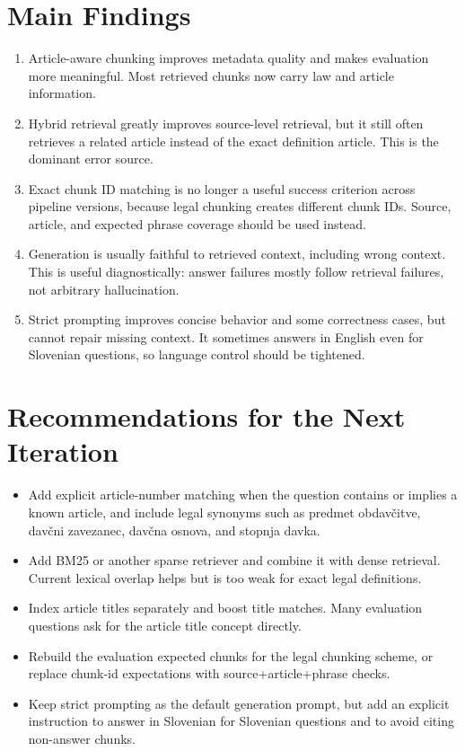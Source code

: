 \documentclass[11pt,a4paper]{article}
\begin{document}
\section{Main Findings}
\begin{enumerate}[leftmargin=*]
\item Article-aware chunking improves metadata quality and makes evaluation more meaningful. Most retrieved chunks now carry law and article information.
\item Hybrid retrieval greatly improves source-level retrieval, but it still often retrieves a related article instead of the exact definition article. This is the dominant error source.
\item Exact chunk ID matching is no longer a useful success criterion across pipeline versions, because legal chunking creates different chunk IDs. Source, article, and expected phrase coverage should be used instead.
\item Generation is usually faithful to retrieved context, including wrong context. This is useful diagnostically: answer failures mostly follow retrieval failures, not arbitrary hallucination.
\item Strict prompting improves concise behavior and some correctness cases, but cannot repair missing context. It sometimes answers in English even for Slovenian questions, so language control should be tightened.
\end{enumerate}
\section{Recommendations for the Next Iteration}
\begin{itemize}[leftmargin=*]
\item Add explicit article-number matching when the question contains or implies a known article, and include legal synonyms such as predmet obdavčitve, davčni zavezanec, davčna osnova, and stopnja davka.
\item Add BM25 or another sparse retriever and combine it with dense retrieval. Current lexical overlap helps but is too weak for exact legal definitions.
\item Index article titles separately and boost title matches. Many evaluation questions ask for the article title concept directly.
\item Rebuild the evaluation expected chunks for the legal chunking scheme, or replace chunk-id expectations with source+article+phrase checks.
\item Keep strict prompting as the default generation prompt, but add an explicit instruction to answer in Slovenian for Slovenian questions and to avoid citing non-answer chunks.
\end{itemize}
\end{document}
